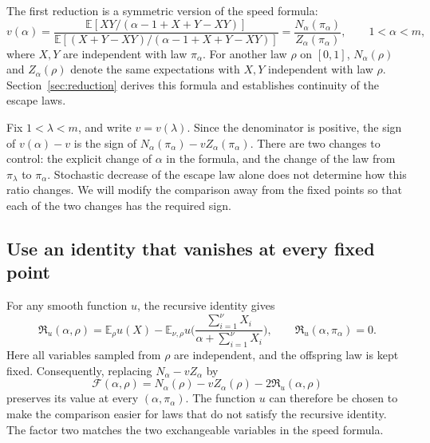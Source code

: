 \documentclass[11pt,a4paper]{article}
\numberwithin{equation}{section}
\theoremstyle{notethm}
\theoremstyle{definition}
\newcommand{\E}{\mathbb E}
\newcommand{\cF}{\mathscr F}
\newcommand{\res}{\mathfrak R}
\begin{document}
The first reduction is a symmetric version of the speed formula:
\begin{equation}\label{eq:roadmap-speed}
 v(\alpha)
 =\frac{\E[XY/(\alpha-1+X+Y-XY)]}
        {\E[(X+Y-XY)/(\alpha-1+X+Y-XY)]}
 =\frac{N_\alpha(\pi_\alpha)}{Z_\alpha(\pi_\alpha)},
 \qquad 1<\alpha<m,
\end{equation}
where $X,Y$ are independent with law $\pi_\alpha$. For another law
$\rho$ on $[0,1]$, $N_\alpha(\rho)$ and $Z_\alpha(\rho)$ denote the same
expectations with $X,Y$ independent with law $\rho$.
Section~\ref{sec:reduction} derives this formula and establishes continuity
of the escape laws.

Fix $1<\lambda<m$, and write $v=v(\lambda)$. Since the denominator is
positive, the sign of $v(\alpha)-v$ is the sign of
$N_\alpha(\pi_\alpha)-vZ_\alpha(\pi_\alpha)$.
There are two changes to control: the explicit change of $\alpha$ in the
formula, and the change of the law from $\pi_\lambda$ to $\pi_\alpha$.
Stochastic decrease of the escape law alone does not determine how this
ratio changes. We will modify the comparison away from the fixed points
so that each of the two changes has the required sign.

\subsection{Use an identity that vanishes at every fixed point}

For any smooth function $u$, the recursive identity gives
\begin{equation}\label{eq:roadmap-residual}
 \res_u(\alpha,\rho)
 =\E_\rho u(X)
  -\E_{\nu,\rho}u\biggl(
      \frac{\sum_{i=1}^{\nu}X_i}{\alpha+\sum_{i=1}^{\nu}X_i}
    \biggr),
 \qquad \res_u(\alpha,\pi_\alpha)=0.
\end{equation}
Here all variables sampled from $\rho$ are independent, and the offspring
law is kept fixed. Consequently, replacing $N_\alpha-vZ_\alpha$ by
\[
 \cF(\alpha,\rho)
 =N_\alpha(\rho)-vZ_\alpha(\rho)-2\res_u(\alpha,\rho)
\]
preserves its value at every $(\alpha,\pi_\alpha)$. The function $u$ can
therefore be chosen to make the comparison easier for laws that do not
satisfy the recursive identity. The factor two matches the two
exchangeable variables in the speed formula.
\end{document}
